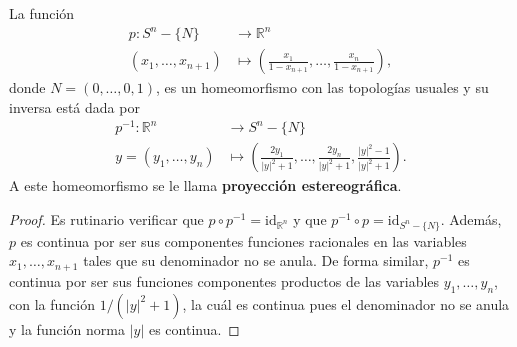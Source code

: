

\begin{theorem}
La función
\begin{align*}
    p : S^n-\{ N \} & \longrightarrow \mathbb{R}^n \\
    (x_1,\ldots,x_{n+1}) & \longmapsto \left( \frac{x_1}{1-x_{n+1}}, \ldots, \frac{x_n}{1-x_{n+1}} \right),
\end{align*}
donde $N=(0,\ldots,0,1)$, es un homeomorfismo con las topologías usuales y su inversa está dada por
\begin{align*}
    p^{-1} : \mathbb{R}^n & \longrightarrow S^n - \{ N \} \\
    y = (y_1,\ldots,y_n) & \longmapsto \left( \frac{2 y_1}{|y|^2+1}, \ldots, \frac{2 y_n}{|y|^2+1}, \frac{|y|^2-1}{|y|^2+1} \right).
\end{align*}
A este homeomorfismo se le llama \textbf{proyección estereográfica}.
\end{theorem}

\begin{proof}
Es rutinario verificar que $p \circ p^{-1} = \text{id}_{\mathbb{R}^n}$ y que $p^{-1} \circ p = \text{id}_{S^n - \{ N \}}$. Además, $p$ es continua por ser sus componentes funciones racionales en las variables $x_1,\ldots,x_{n+1}$ tales que su denominador no se anula. De forma similar, $p^{-1}$ es continua por ser sus funciones componentes productos de las variables $y_1,\ldots,y_n$, con la función $1/(|y|^2+1)$, la cuál es continua pues el denominador no se anula y la función norma $|y|$ es continua.
\end{proof}
